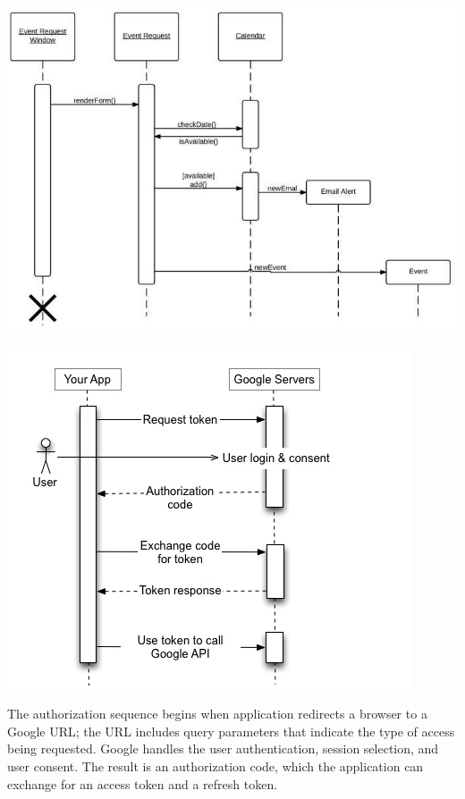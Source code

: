 \par 
\includegraphics[width=\textwidth]{Sequence_Diagram3}
\par 
\includegraphics[width=\textwidth]{Sequence_Diagram4}

\par The authorization sequence begins when  application redirects a browser to a Google URL; the URL includes query parameters that indicate the type of access being requested. Google handles the user authentication, session selection, and user consent. The result is an authorization code, which the application can exchange for an access token and a refresh token.

